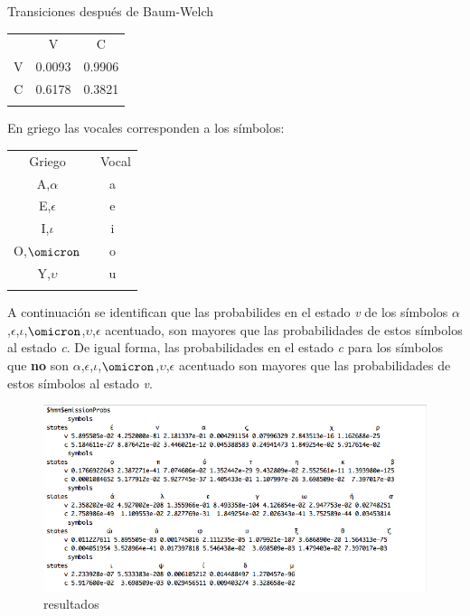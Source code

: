 \documentclass[]{article}
\begin{document}
Transiciones después de Baum-Welch

\begin{longtable}[c]{@{}ccc@{}}
\toprule\addlinespace
& V & C
\\\addlinespace
\midrule\endhead
V & 0.0093 & 0.9906
\\\addlinespace
C & 0.6178 & 0.3821
\\\addlinespace
\bottomrule
\end{longtable}

En griego las vocales corresponden a los símbolos:

\begin{longtable}[c]{@{}cc@{}}
\toprule\addlinespace
Griego & ~Vocal
\\\addlinespace
\midrule\endhead
A,$\alpha$ & a
\\\addlinespace
E,$\epsilon$ & e
\\\addlinespace
I,$\iota$ & i
\\\addlinespace
O,$\omicron$ & o
\\\addlinespace
Y,$\upsilon$ & u
\\\addlinespace
\bottomrule
\end{longtable}

A continuación se identifican que las probabilides en el estado \emph{v}
de los símbolos
$\alpha$,$\epsilon$,$\iota$,$\omicron$,$\upsilon$,$\epsilon$ acentuado,
son mayores que las probabilidades de estos símbolos al estado \emph{c}.
De igual forma, las probabilidades en el estado \emph{c} para los
símbolos que \textbf{no} son
$\alpha$,$\epsilon$,$\iota$,$\omicron$,$\upsilon$,$\epsilon$ acentuado
son mayores que las probabilidades de estos símbolos al estado \emph{v}.

\begin{figure}[htbp]
\centering
\includegraphics{salida_vocales_griego.png}
\caption{resultados}
\end{figure}
\end{document}
